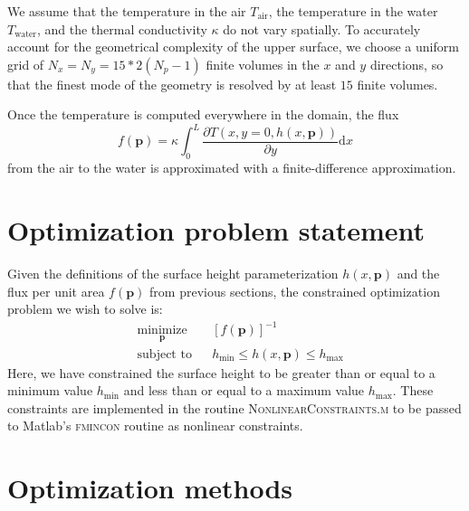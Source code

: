 \documentclass[11pt]{article}
\begin{document}
We assume that the temperature in the air $T_{\text{air}}$,
the temperature in the water $T_{\text{water}}$,
and the thermal conductivity $\kappa$ do not vary spatially.
To accurately account for the geometrical complexity of the upper
surface,
we choose a uniform grid of $N_x = N_y = 15*2(N_p-1)$
finite volumes in the $x$ and $y$ directions, so that the finest mode
of the geometry is resolved by at least $15$ finite volumes.

Once the temperature is computed everywhere in the domain,
the flux
\begin{equation}
f(\boldsymbol{p}) = \kappa \int_0^L
\frac{\partial T(x,y=0,h(x,\boldsymbol{p}))}{\partial y} \text{d} x
\end{equation}
from the air to the water is approximated
with a finite-difference approximation.

\section{Optimization problem statement}

Given the definitions of the surface height parameterization
$h(x, \boldsymbol{p})$ and the flux per unit area $f(\boldsymbol{p})$
from previous sections, the constrained optimization problem we wish
to solve is: 
\begin{equation}
\begin{aligned}
& \underset{\boldsymbol{p}}{\text{minimize}}
& & \left[ f(\boldsymbol{p}) \right]^{-1} \\
& \text{subject to}
& & h_{\text{min}} \leq h(x, \boldsymbol{p}) \leq h_{\text{max}}
\end{aligned}
\label{eq:optimize}
\end{equation}
Here, we have constrained the surface height to be greater than
or equal to a minimum value $h_{\text{min}}$ and less than or equal
to a maximum value $h_{\text{max}}$. These constraints are
implemented in the routine \textsc{NonlinearConstraints.m}
to be passed to Matlab's \textsc{fmincon} routine as nonlinear
constraints.

\section{Optimization methods}
\end{document}
